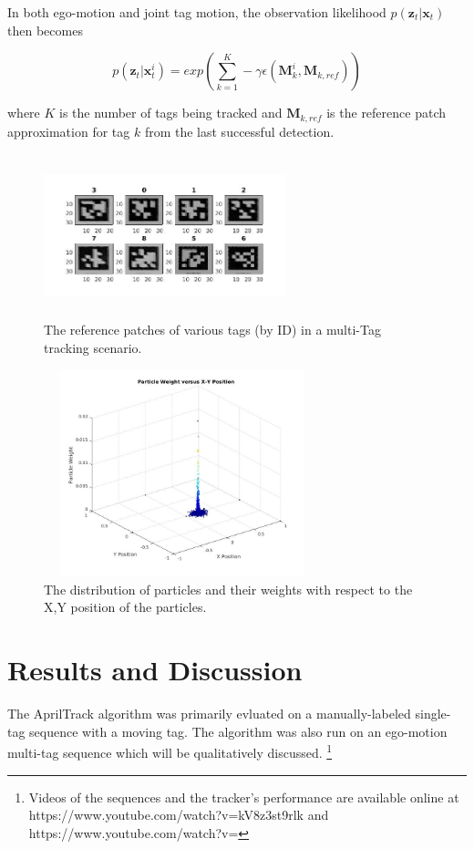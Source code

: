 \documentclass[letterpaper, 10 pt, conference]{ieeeconf}
\renewcommand{\vec}[1]{\boldsymbol{#1}}
\begin{document}
In both ego-motion and joint tag motion, the observation likelihood $p(\vec{z}_t|\vec{x}_{t})$ then becomes

\begin{equation}
	p(\vec{z}_t|\vec{x}^i_{t}) = exp(\sum^{K}_{k=1} -\gamma \epsilon(\vec{M}^i_k, \vec{M}_{k, ref}))
\end{equation}

where $K$ is the number of tags being tracked and $\vec{M}_{k,ref}$ is the reference patch approximation for tag $k$ from the last successful detection.



\begin{figure}
	\centering
	\includegraphics[width=7cm,height=4.75cm]{RefPatches}
	\caption{The reference patches of various tags (by ID) in a multi-Tag tracking scenario.}
\end{figure}
\begin{figure}
	\centering
	\includegraphics[width=8cm,height=6cm]{Particles2}
	\caption{The distribution of particles and their weights with respect to the X,Y position of the particles.}
\end{figure}

\section{Results and Discussion}

The AprilTrack algorithm was primarily evluated on a manually-labeled single-tag sequence with a moving tag. The algorithm was also run on an ego-motion multi-tag sequence which will be qualitatively discussed.
\footnote{Videos of the sequences and the tracker's performance are available online at https://www.youtube.com/watch?v=kV8z3st9rlk and https://www.youtube.com/watch?v= }
\end{document}
